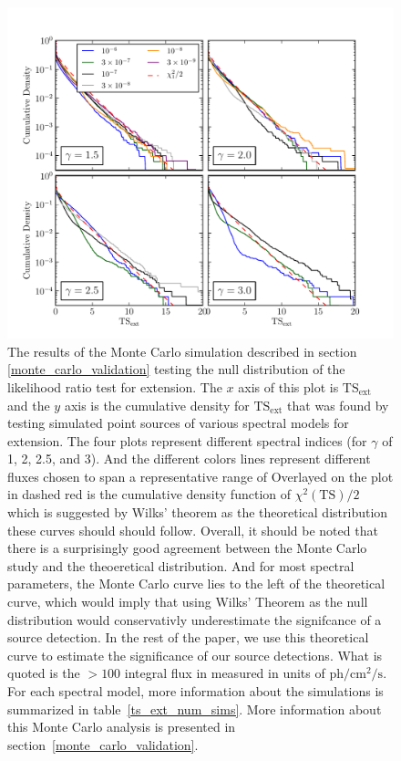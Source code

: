 \documentclass[12pt,preprint]{aastex}
\newcommand{\mev}{\text{MeV}\xspace}
\newcommand{\s}{\text{s}\xspace}
\newcommand{\ph}{\text{ph}\xspace}
\newcommand{\cm}{\text{cm}\xspace}
\newcommand{\tsext}{{\ensuremath{\text{TS}_\text{ext}}}\xspace}
\newcommand{\ts}{\text{TS}\xspace}
\begin{document}
\clearpage
\begin{figure}
  \begin{center}
    \includegraphics{mc_plots/ts_ext_emin_1000.pdf}
    \end{center}
    \caption{
    The results of the Monte Carlo simulation described in section
    \ref{monte_carlo_validation} testing the null distribution of
    the likelihood ratio test for extension.  The $x$ axis of this
    plot is \tsext and the $y$ axis is the cumulative density for
    \tsext that was found by testing simulated point sources of
    various spectral models for extension. The four plots represent
    different spectral indices (for $\gamma$ of 1, 2, 2.5, and 3).
    And the different colors lines represent different fluxes chosen
    to span a representative range of Overlayed on the plot in dashed
    red is the cumulative density function of $\chi^2(\ts)/2$ which is
    suggested by Wilks' theorem as the theoretical distribution these
    curves should should follow.  Overall, it should be noted that there
    is a surprisingly good agreement between the Monte Carlo study and
    the theoeretical distribution. And for most spectral parameters, the
    Monte Carlo curve lies to the left of the theoretical curve, which
    would imply that using Wilks' Theorem as the null distribution would
    conservativly underestimate the signifcance of a source detection. In
    the rest of the paper, we use this theoretical curve to estimate
    the significance of our source detections.  What is quoted is the
    $>100$ \mev integral flux in measured in units of $\ph/\cm^2/\s$.
    For each spectral model, more information about the simulations is
    summarized in table~\ref{ts_ext_num_sims}. More
    information about this Monte Carlo analysis is presented in
    section~\ref{monte_carlo_validation}.
    }\label{ts_ext_mc}
  \end{figure}
\end{document}
